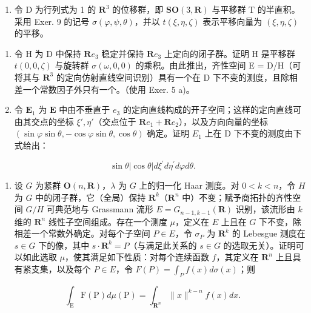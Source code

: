 \begin{enumerate}
\def\labelenumi{\arabic{enumi})}
\setcounter{enumi}{9}
\tightlist
\item
  令 D 为行列式为 1 的 \(\mathbf{R}^{3}\) 的位移群，即 \(\mathbf{SO}(3,\mathbf{R})\) 与平移群 T 的半直积。采用 Exer. 9 的记号 \(\sigma(\varphi,\psi,\theta)\)，并以 \(t(\xi,\eta,\zeta)\) 表示平移向量为 \((\xi,\eta,\zeta)\) 的平移。
\end{enumerate}

\begin{enumerate}
\def\labelenumi{\alph{enumi})}
\item
  令 H 为 D 中保持 \(\mathbf{R}e_{3}\) 稳定并保持 \(\mathbf{R}e_{3}\) 上定向的闭子群。证明 H 是平移群 \(t(0,0,\zeta)\) 与旋转群 \(\sigma(\omega,0,0)\) 的乘积。由此推出，齐性空间 E = D/H（可将其与 \(\mathbf{R}^{3}\) 的定向仿射直线空间识别）具有一个在 D 下不变的测度，且除相差一个常数因子外只有一个。（使用 Exer. 5 a)。
\item
  令 \(\mathbf{E}_1\) 为 \(\mathbf{E}\) 中由不垂直于 \(e_3\) 的定向直线构成的开子空间；这样的定向直线可由其交点的坐标 \(\xi', \eta'\)（交点位于 \(\mathbf{R}e_{1} + \mathbf{R}e_{2}\)），以及方向向量的坐标 \((\sin \varphi \sin \theta, -\cos \varphi \sin \theta, \cos \theta)\) 确定。证明 \(E_{1}\) 上在 D 下不变的测度由下式给出：
\end{enumerate}

\[
\sin \theta | \cos \theta | d \xi^ {\prime} d \eta^ {\prime} d \varphi d \theta .
\]

\begin{enumerate}
\def\labelenumi{\arabic{enumi})}
\setcounter{enumi}{10}
\tightlist
\item
  设 \(G\) 为紧群 \(\mathbf{O}(n, \mathbf{R})\)，\(\lambda\) 为 \(G\) 上的归一化 Haar 测度。对 \(0 < k < n\)，令 \(H\) 为 \(G\) 中的闭子群，它（全局）保持 \(\mathbf{R}^k\)（\(\mathbf{R}^n\) 中）不变；赋予商拓扑的齐性空间 \(G / H\) 可典范地与 Grassmann 流形 \(E = G_{n-1, k-1}(\mathbf{R})\) 识别，该流形由 \(k\) 维的 \(\mathbf{R}^n\) 线性子空间组成。存在一个测度 \(\mu\)，定义在 \(E\) 上且在 \(G\) 下不变，除相差一个常数外确定。对每个子空间 \(P \in E\)，令 \(\sigma_P\) 为 \(\mathbf{R}^k\) 的 Lebesgue 测度在 \(s \in G\) 下的像，其中 \(s \cdot \mathbf{R}^k = P\)（与满足此关系的 \(s \in G\) 的选取无关）。证明可以如此选取 \(\mu\)，使其满足如下性质：对每个连续函数 \(f\)，其定义在 \(\mathbf{R}^n\) 上且具有紧支集，以及每个 \(P \in E\)，令 \(F(P) = \int_{P} f(x) d\sigma(x)\)；则
\end{enumerate}

\[
\int_ {\mathrm{E}} \mathrm{F} (\mathrm{P}) d \mu (\mathrm{P}) = \int_ {\mathbf {R} ^ {n}} \| x \| ^ {k - n} f (x) d x.
\]

